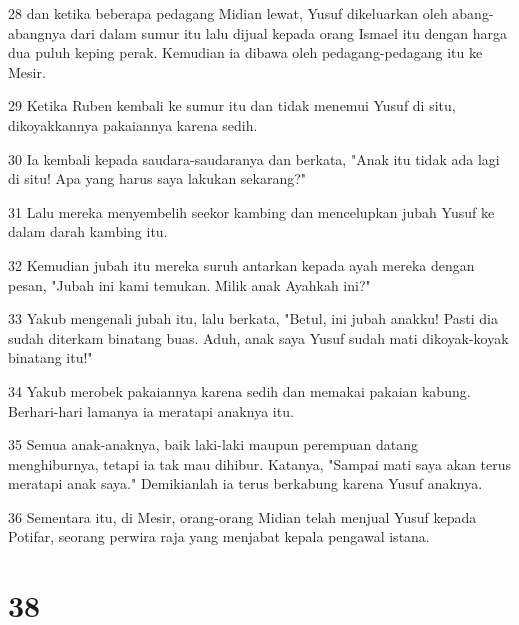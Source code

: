 \par 28 dan ketika beberapa pedagang Midian lewat, Yusuf dikeluarkan oleh abang-abangnya dari dalam sumur itu lalu dijual kepada orang Ismael itu dengan harga dua puluh keping perak. Kemudian ia dibawa oleh pedagang-pedagang itu ke Mesir.
\par 29 Ketika Ruben kembali ke sumur itu dan tidak menemui Yusuf di situ, dikoyakkannya pakaiannya karena sedih.
\par 30 Ia kembali kepada saudara-saudaranya dan berkata, "Anak itu tidak ada lagi di situ! Apa yang harus saya lakukan sekarang?"
\par 31 Lalu mereka menyembelih seekor kambing dan mencelupkan jubah Yusuf ke dalam darah kambing itu.
\par 32 Kemudian jubah itu mereka suruh antarkan kepada ayah mereka dengan pesan, "Jubah ini kami temukan. Milik anak Ayahkah ini?"
\par 33 Yakub mengenali jubah itu, lalu berkata, "Betul, ini jubah anakku! Pasti dia sudah diterkam binatang buas. Aduh, anak saya Yusuf sudah mati dikoyak-koyak binatang itu!"
\par 34 Yakub merobek pakaiannya karena sedih dan memakai pakaian kabung. Berhari-hari lamanya ia meratapi anaknya itu.
\par 35 Semua anak-anaknya, baik laki-laki maupun perempuan datang menghiburnya, tetapi ia tak mau dihibur. Katanya, "Sampai mati saya akan terus meratapi anak saya." Demikianlah ia terus berkabung karena Yusuf anaknya.
\par 36 Sementara itu, di Mesir, orang-orang Midian telah menjual Yusuf kepada Potifar, seorang perwira raja yang menjabat kepala pengawal istana.

\chapter{38}

